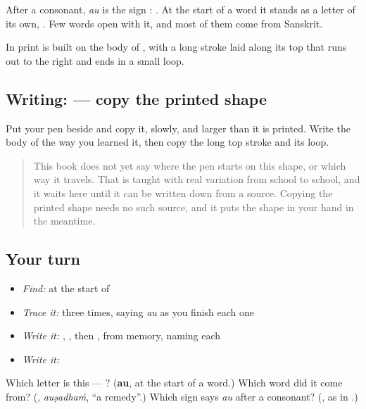 After a consonant, \emph{au} is the sign \textbf{}: \textbf{}. At the start of a word it stands as a letter of its own, \textbf{}. Few words open with it, and most of them come from Sanskrit.

In print \textbf{} is built on the body of \textbf{}, with a long stroke laid along its top that runs out to the right and ends in a small loop.

\subsection*{Writing:  — copy the printed shape}
Put your pen beside \textbf{} and copy it, slowly, and larger than it is printed. Write the body of \textbf{} the way you learned it, then copy the long top stroke and its loop.

\begin{quote}
This book does not yet say where the pen starts on this shape, or which way it travels. That is taught with real variation from school to school, and it waits here until it can be written down from a source. Copying the printed shape needs no such source, and it puts the shape in your hand in the meantime.
\end{quote}

\subsection*{Your turn}
\begin{itemize}
\raggedright
  \item \emph{Find:}  at the start of \textbf{}
  \item \emph{Trace it:}  three times, saying \emph{au} as you finish each one
  \item \emph{Write it:} , , then , from memory, naming each
  \item \emph{Write it:} \textbf{}
\end{itemize}

\begin{tcolorbox}[breakable,colback=teal!4,colframe=teal!35!black,title={Before you move on}]
Which letter is this — ? (\textbf{au}, at the start of a word.) Which word did it come from? (\textbf{}, \emph{auṣadhaṁ}, \textquotedblleft{}a remedy\textquotedblright{}.) Which sign says \emph{au} after a consonant? (\textbf{}, as in \textbf{}.)
\end{tcolorbox}

